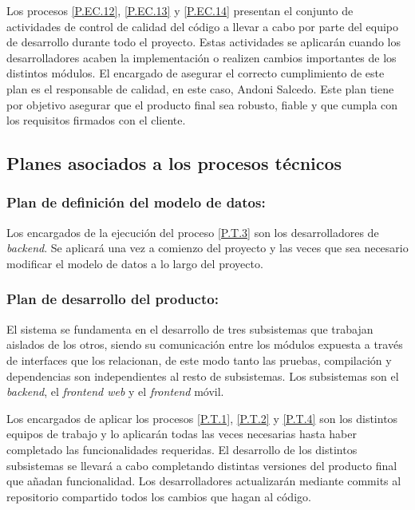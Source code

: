 \documentclass{article}
\begin{document}
Los procesos \ref{P.EC.12}, \ref{P.EC.13} y \ref{P.EC.14} presentan el conjunto de actividades de control de calidad del código a llevar a cabo por parte del equipo de desarrollo durante todo el proyecto. Estas actividades se aplicarán cuando los desarrolladores acaben la implementación o realizen cambios importantes de los distintos módulos. El encargado de asegurar el correcto cumplimiento de este plan es el responsable de calidad, en este caso, Andoni Salcedo. Este plan tiene por objetivo asegurar que el producto final sea robusto, fiable y que cumpla con los requisitos firmados con el cliente.

\subsection{Planes asociados a los procesos técnicos}

\subsubsection{Plan de definición del modelo de datos:} \label{PL.T.1}
Los encargados de la ejecución del proceso \ref{P.T.3} son los desarrolladores de \textit{backend}. Se aplicará una vez a comienzo del proyecto y las veces que sea necesario modificar el modelo de datos a lo largo del proyecto.

\subsubsection{Plan de desarrollo del producto: } \label{PL.T.2}

El sistema se fundamenta en el desarrollo de tres subsistemas que trabajan aislados de los otros, siendo su comunicación entre los módulos expuesta a través de interfaces que los relacionan, de este modo tanto las pruebas, compilación y dependencias son independientes al resto de subsistemas. Los subsistemas son el \textit{backend}, el \textit{frontend web} y el \textit{frontend} móvil. 

Los encargados de aplicar los procesos \ref{P.T.1}, \ref{P.T.2} y \ref{P.T.4} son los distintos equipos de trabajo y lo aplicarán todas las veces necesarias hasta haber completado las funcionalidades requeridas. El desarrollo de los distintos subsistemas se llevará a cabo completando distintas versiones del producto final que añadan funcionalidad. Los desarrolladores actualizarán mediante commits al repositorio compartido todos los cambios que hagan al código.
\end{document}
